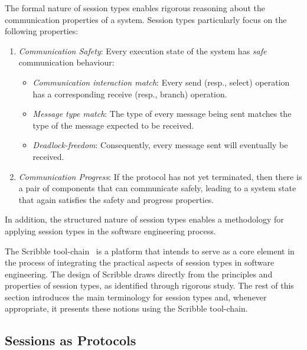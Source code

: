 The formal nature of session types enables rigorous
reasoning about the communication properties of a system.
Session types particularly focus on the following properties:
%
\begin{enumerate}[label=$\bullet$]
	\item	{\em Communication Safety}: Every execution state of the system has {\em safe} communication behaviour:
	\begin{itemize}
		\item	{\em Communication interaction match}:
				Every send (resp., select) operation has a corresponding receive (resp., branch) operation.
		\item	{\em Message type match}:
				The type of every message being sent matches the type of the message expected to be received.
		\item	{\em Deadlock-freedom}:
				Consequently, every message sent will eventually be received.
	\end{itemize}
	
	\item	{\em Communication Progress}: If the protocol has not yet terminated, then there is a pair of components that can communicate safely, leading to a system state that again satisfies the safety and progress properties.
\end{enumerate}
%
In addition, the structured nature of session types enables
a methodology for applying session types in the software 
engineering process.


The Scribble tool-chain~\cite{scribble} is a platform
that intends to serve as a core element in the process
of integrating the practical aspects of session types
in software engineering. The design of Scribble
draws directly from the principles and properties of session types,
as identified through rigorous study. The rest of this
section introduces the main terminology for session types
and, whenever appropriate, it presents these notions
using the Scribble tool-chain.

\subsection{Sessions as Protocols}%
\label{sec:sessions_scribble}

